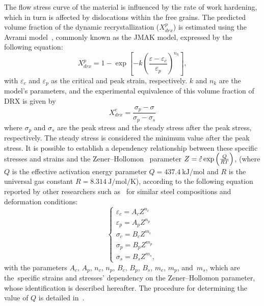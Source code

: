 \documentclass[metals,article,accept,pdftex,moreauthors]{Definitions/mdpi}
\DeclareRobustCommand{\mdot}[1]{\accentset{\mbox{\bfseries .}}{#1}}
\begin{document}
The flow stress curve of the material is influenced by the rate of work hardening, which in turn is affected by dislocations within the free grains.
The predicted volume fraction of the dynamic recrystallization ($X_{drx}^{p}$) is estimated using the Avrami model~\cite{Avrami-1939}, commonly known as the JMAK model, expressed by the following equation:
\begin{equation}
X_{drx}^{p} = 1 - \exp\left[ -k\left(\frac{\varepsilon - \varepsilon_c}{\varepsilon_p}\right)^{n_k}\right],
\label{eq:drxpred}
\end{equation}
with %
 $\varepsilon_c$ and $\varepsilon_p$ as the critical and peak strain, respectively. $k$ and $n_k$ are the model's parameters, and the experimental equivalence of this volume fraction of DRX is given by
\begin{equation}
X_{drx}^{e} = \frac{\sigma_p-\sigma}{\sigma_p-\sigma_{s}}
\label{eq:drxexp}
\end{equation}
where $\sigma_p$ and $\sigma_s$ are the peak stress and the steady stress after the peak stress, respectively.
The steady stress is considered the minimum value after the peak stress.
It is possible to establish a dependency relationship between these specific stresses and strains and the Zener--Hollomon~\cite{Zenner-1944} parameter $Z = \mdot\varepsilon \exp{\left(\frac{Q}{RT}\right)} \label{eq:ArZ}$, (where $Q$ is the effective activation energy parameter $Q=437.4~\text{kJ/mol}$ and $R$ is the universal gas constant $R=8.314~\text{J/mol/K}$), according to the following equation reported by other researchers such as~\cite{Chen-2014,Li-2019,Wang-2021} for similar steel compositions and deformation conditions:
\begin{equation}
\begin{cases}
\varepsilon_c = A_cZ^{n_c} \\ \varepsilon_p = A_pZ^{n_p} \\ \sigma_c = B_cZ^{m_c} \\ \sigma_p = B_pZ^{m_p}\\ \sigma_s = B_sZ^{m_s},
\end{cases}
\label{eq:paramsZ}
\end{equation}
with the parameters $A_c$, $A_p$, $n_c$, $n_p$, $B_c$, $B_p$, $B_s$, $m_c$, $m_p$, and~$m_s$, which are %
the~specific strains and stresses' dependency on the Zener--Hollomon parameter, whose identification is described hereafter.
The procedure for determining the value of $Q$ is detailed in~\cite{TizeMha-2023}.
\end{document}
